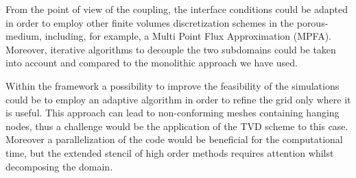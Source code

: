 From the point of view of the coupling, the interface conditions could be adapted in order to employ other finite volumes discretization schemes in the porous-medium, including, for example, a Multi Point Flux Approximation (MPFA).
Moreover, iterative algorithms to decouple the two subdomains could be taken 
into account and compared to the monolithic approach we have used.

Within the \DUMUX framework a possibility to improve the feasibility of the 
simulations could be to employ an adaptive algorithm in order to refine the grid 
only where it is useful. This approach can lead to non-conforming meshes 
containing hanging nodes, thus a challenge would be the application of the TVD 
scheme to this case. Moreover a parallelization of the code would be 
beneficial for the computational time, but the extended stencil of high order methods 
requires attention whilst decomposing the domain.